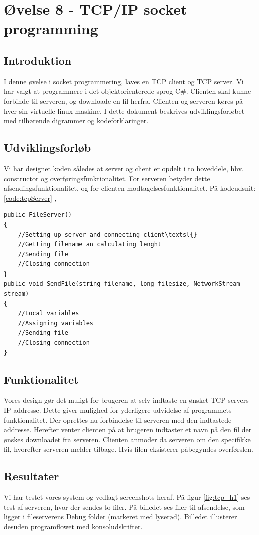 \section{Øvelse 8 - TCP/IP socket programming}

\subsection{Introduktion}
I denne øvelse i socket programmering, laves en TCP client og TCP server. Vi har valgt at programmere i det objektorienterede sprog C\#. Clienten skal kunne forbinde til serveren, og downloade en fil herfra. Clienten og serveren køres på hver sin virtuelle linux maskine. I dette dokument beskrives udviklingsforløbet med tilhørende digrammer og kodeforklaringer.
\subsection{Udviklingsforløb}
Vi har designet koden således at server og client er opdelt i to hoveddele, hhv. constructor og overføringsfunktionalitet. For serveren betyder dette afsendingsfunktionalitet, og for clienten modtagelsesfunktionalitet. På kodeudsnit: \ref{code:tcpServer} ,

\begin{lstlisting}[caption = Hoveddesign for server,label=code:tcpServer]
public FileServer()
{
	//Setting up server and connecting client\textsl{}
	//Getting filename an calculating lenght
	//Sending file 
	//Closing connection
}
public void SendFile(string filename, long filesize, NetworkStream stream)
{
	//Local variables
	//Assigning variables
	//Sending file
	//Closing connection
}
\end{lstlisting}

\subsection{Funktionalitet}
Vores design gør det muligt for brugeren at selv indtaste en ønsket TCP servers IP-addresse. Dette giver mulighed for yderligere udvidelse af programmets funktionalitet. Der oprettes nu forbindelse til serveren med den indtastede addresse. Herefter venter clienten på at brugeren indtaster et navn på den fil der ønskes downloadet fra serveren. Clienten  anmoder da serveren om den specifikke fil, hvorefter serveren melder tilbage. Hvis filen eksisterer påbegyndes overførslen.

\subsection{Resultater}
Vi har testet vores system og vedlagt screenshots heraf. På figur \ref{fig:tcp_h1} ses test af serveren, hvor der sendes to filer. På billedet ses filer til afsendelse, som ligger i fileserverens Debug folder (markeret med lyserød). Billedet illusterer desuden programflowet med konsoludskrifter.

